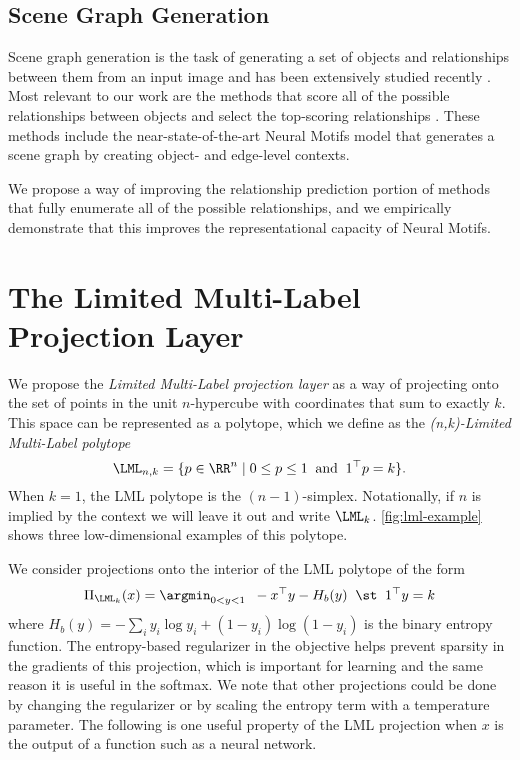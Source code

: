 \subsection{Scene Graph Generation}
\label{sec:lml:rw:sg}

Scene graph generation is the task of generating a set
of objects and relationships between them from an
input image and has been extensively studied recently
\cite{johnson2015image,yang2017support,plummer2017phrase,
  liang2017deep,raposo2017discovering,newell2017pixels,
  xu2017scene,li2018factorizable,
  herzig2018mapping,zellers2018neural,woo2018linknet}.
Most relevant to our work are the methods that score
all of the possible relationships between objects and
select the top-scoring relationships
\cite{xu2017scene,li2018factorizable,herzig2018mapping,woo2018linknet}.
These methods include the near-state-of-the-art
Neural Motifs model \citep{zellers2018neural}
that generates a scene graph by creating object-
and edge-level contexts.

We propose a way of improving the relationship prediction
portion of methods that fully enumerate all of the
possible relationships, and we empirically
demonstrate that this improves the
representational capacity of Neural Motifs.

\section{The Limited Multi-Label Projection Layer}
\label{sec:lml:lml}

We propose the \emph{Limited Multi-Label projection layer} as
a way of projecting onto the set of points in the unit
$n$-hypercube with coordinates that sum to exactly $k$.
This space can be represented as a polytope, which we define
as the \emph{(n,k)-Limited Multi-Label polytope}
$$\LML_{n,k} = \{p\in\RR^n \mid 0\leq p\leq 1 \;\;
  {\rm and} \;\; 1^\top p = k\}.$$
When $k=1$, the LML polytope is the $(n-1)$-simplex.
Notationally, if $n$ is implied by the context we will leave
it out and write $\LML_k$.
\cref{fig:lml-example} shows three low-dimensional examples
of this polytope.

We consider projections onto the interior of the LML polytope
of the form
\begin{equation}
  \Pi_{\LML_k}(x) = \argmin_{0<y<1} \;\; -x^\top y - H_b(y) \;\; \st\;\; 1^\top y = k
  \label{eq:lml-proj}
\end{equation}
where $H_b(y) = - \sum_i y_i\log y_i + (1-y_i)\log (1-y_i)$
is the binary entropy function.
The entropy-based regularizer in the objective helps prevent
sparsity in the gradients of this projection, which
is important for learning and the same reason it is useful
in the softmax.
We note that other projections could be done by changing the
regularizer or by scaling the entropy term with
a temperature parameter.
The following is one useful property of the LML projection
when $x$ is the output of a function such as a neural network.

